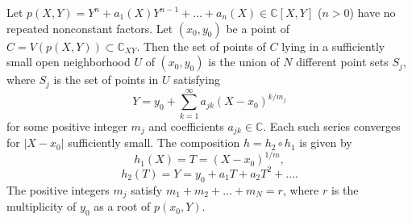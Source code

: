 Let $p(X, Y) = Y^n + a_1(X)Y^{n-1} + \ldots + a_n(X) \in \mathbb{C}[X, Y]$ ($n > 0$) have no repeated nonconstant factors. Let $(x_0, y_0)$ be a point of $C = V(p(X, Y)) \subset \mathbb{C}_{XY}$. Then the set of points of $C$ lying in a sufficiently small open neighborhood $U$ of $(x_0, y_0)$ is the union of $N$ different point sets $S_j$, where $S_j$ is the set of points in $U$ satisfying
$$Y = y_0 + \sum_{k=1}^{\infty} a_{jk} (X - x_0)^{k/m_j}$$
for some positive integer $m_j$ and coefficients $a_{jk} \in \mathbb{C}$. Each such series converges for $|X - x_0|$ sufficiently small. The composition $h = h_2 \circ h_1$ is given by
$$h_1(X) = T = (X - x_0)^{1/m},$$
$$h_2(T) = Y = y_0 + a_1 T + a_2 T^2 + \ldots.$$
The positive integers $m_j$ satisfy $m_1 + m_2 + \ldots + m_N = r$, where $r$ is the multiplicity of $y_0$ as a root of $p(x_0, Y)$.
